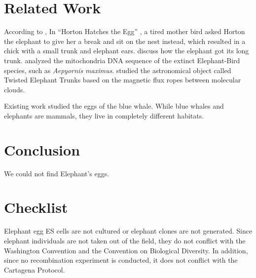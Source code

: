 \section{Related Work}

According to \citet{folbre1997future},
In ``Horton Hatches the Egg'' \cite{seuss1968horton},
a tired mother bird asked Horton the elephant to give her a break and
sit on the nest instead, which resulted in a chick with a small trunk and
elephant ears.
\citet{kipling1983elephant} discuss how the elephant got its long trunk.
\citet{cooper2001complete} analyzed the mitochondria DNA sequence of the extinct Elephant-Bird species,
such as \emph{Aepyornis maximus}.
\citet{carlqvist2003theory} studied the astronomical object called Twisted Elephant Trunks
based on the magnetic flux ropes between molecular clouds.

Existing work studied the eggs of the blue whale.
While blue whales and elephants are mammals, they live in completely different habitats.

\section{Conclusion}

We could not find Elephant's eggs.

\section*{Checklist}

Elephant egg ES cells are not cultured or elephant clones are not
generated. Since elephant individuals are not taken out of the field,
they do not conflict with the Washington Convention and the Convention
on Biological Diversity. In addition, since no recombination experiment
is conducted, it does not conflict with the Cartagena Protocol.


